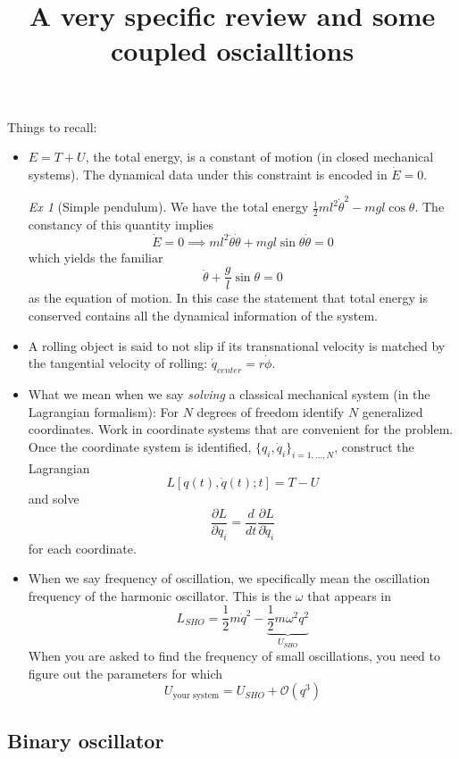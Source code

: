\documentclass{article}
\title{A very specific review and some coupled oscialltions}
\theoremstyle{definition}
\theoremstyle{remark}
\theoremstyle{example}
\newtheorem*{example}{Ex}
\begin{document}
\maketitle

Things to recall:
\begin{itemize}
  \item $E=T+U$, the total energy, is a constant of motion (in closed mechanical systems). The dynamical data under this constraint is encoded in $\dot E=0$.
  \begin{example}[Simple pendulum] We have the total energy $\frac{1}{2}m l^2\dot \theta^2-mgl\cos\theta$. The constancy of this quantity implies
    $$
    \dot E =0 \implies ml^2 \ddot \theta\dot\theta+ mgl \sin \theta \dot \theta = 0
    $$
    which yields the familiar
    $$
    \ddot \theta+\frac{g}{l}\sin\theta =0
    $$
    as the equation of motion. In this case the statement that total energy is conserved contains all the dynamical information of the system.
  \end{example}
  \item A rolling object is said to not slip if its transnational velocity is matched by the tangential velocity of rolling: $\dot q_{center} = r\dot \phi$. 
  \item What we mean when we say \emph{solving} a classical mechanical system (in the Lagrangian formalism): For $N$ degrees of freedom identify $N$ generalized coordinates. Work in coordinate systems that are convenient for the problem. Once the coordinate system is identified, $\{q_i,\dot q_i\}_{i=1,...,N}$, construct the Lagrangian
  $$
  L[q(t),\dot q(t);t] = T-U
  $$
  and solve
  $$
  \frac{\partial L}{\partial q_i} = \frac{d}{dt}\frac{\partial L}{\partial \dot q_i}
  $$
  for each coordinate.
  \item When we say frequency of oscillation, we specifically mean the oscillation frequency of the harmonic oscillator. This is the $\omega$ that appears in
  $$
  L_{SHO} = \frac{1}{2}m\dot q^2-\underbrace{\frac{1}{2}m\omega^2 q^2}_{U_{SHO}}
  $$
  When you are asked to find the frequency of small oscillations, you need to figure out the parameters for which 
  $$
  U_{\text{your system}} = U_{SHO}+\mathcal O(q^3)
  $$
\end{itemize}

\subsection*{Binary oscillator}
\end{document}
